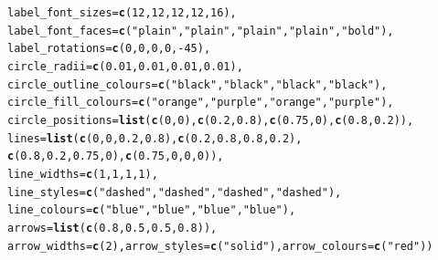 \documentclass{article}\usepackage[]{graphicx}\usepackage[]{color}
\makeatletter
\newcommand{\hlnum}[1]{\textcolor[rgb]{0.686,0.059,0.569}{#1}}%
\newcommand{\hlstr}[1]{\textcolor[rgb]{0.192,0.494,0.8}{#1}}%
\newcommand{\hlopt}[1]{\textcolor[rgb]{0,0,0}{#1}}%
\newcommand{\hlstd}[1]{\textcolor[rgb]{0.345,0.345,0.345}{#1}}%
\newcommand{\hlkwc}[1]{\textcolor[rgb]{0.333,0.667,0.333}{#1}}%
\newcommand{\hlkwd}[1]{\textcolor[rgb]{0.737,0.353,0.396}{\textbf{#1}}}%
\newenvironment{kframe}{%
 \def\at@end@of@kframe{}%
 \ifinner\ifhmode%
  \def\at@end@of@kframe{\end{minipage}}%
  \begin{minipage}{\columnwidth}%
 \fi\fi%
 \def\FrameCommand##1{\hskip\@totalleftmargin \hskip-\fboxsep
 \colorbox{shadecolor}{##1}\hskip-\fboxsep
     \hskip-\linewidth \hskip-\@totalleftmargin \hskip\columnwidth}%
 \MakeFramed {\advance\hsize-\width
   \@totalleftmargin\z@ \linewidth\hsize
   \@setminipage}}%
 {\par\unskip\endMakeFramed%
 \at@end@of@kframe}
\newenvironment{knitrout}{}{} %
\makeatother
\begin{document}
\begin{knitrout}
\begin{kframe}
\begin{alltt}
                \hlkwc{label_font_sizes}\hlstd{=}\hlkwd{c}\hlstd{(}\hlnum{12}\hlstd{,}\hlnum{12}\hlstd{,}\hlnum{12}\hlstd{,}\hlnum{12}\hlstd{,}\hlnum{16}\hlstd{),}
                \hlkwc{label_font_faces}\hlstd{=}\hlkwd{c}\hlstd{(}\hlstr{"plain"}\hlstd{,}\hlstr{"plain"}\hlstd{,}\hlstr{"plain"}\hlstd{,}\hlstr{"plain"}\hlstd{,}\hlstr{"bold"}\hlstd{),}
                \hlkwc{label_rotations}\hlstd{=}\hlkwd{c}\hlstd{(}\hlnum{0}\hlstd{,}\hlnum{0}\hlstd{,}\hlnum{0}\hlstd{,}\hlnum{0}\hlstd{,}\hlopt{-}\hlnum{45}\hlstd{),}
                \hlkwc{circle_radii}\hlstd{=}\hlkwd{c}\hlstd{(}\hlnum{0.01}\hlstd{,}\hlnum{0.01}\hlstd{,}\hlnum{0.01}\hlstd{,}\hlnum{0.01}\hlstd{),}
                \hlkwc{circle_outline_colours}\hlstd{=}\hlkwd{c}\hlstd{(}\hlstr{"black"}\hlstd{,}\hlstr{"black"}\hlstd{,}\hlstr{"black"}\hlstd{,}\hlstr{"black"}\hlstd{),}
                \hlkwc{circle_fill_colours}\hlstd{=}\hlkwd{c}\hlstd{(}\hlstr{"orange"}\hlstd{,}\hlstr{"purple"}\hlstd{,}\hlstr{"orange"}\hlstd{,}\hlstr{"purple"}\hlstd{),}
                \hlkwc{circle_positions}\hlstd{=}\hlkwd{list}\hlstd{(}\hlkwd{c}\hlstd{(}\hlnum{0}\hlstd{,}\hlnum{0}\hlstd{),}\hlkwd{c}\hlstd{(}\hlnum{0.2}\hlstd{,}\hlnum{0.8}\hlstd{),}\hlkwd{c}\hlstd{(}\hlnum{0.75}\hlstd{,}\hlnum{0}\hlstd{),}\hlkwd{c}\hlstd{(}\hlnum{0.8}\hlstd{,}\hlnum{0.2}\hlstd{)),}
                \hlkwc{lines}\hlstd{=}\hlkwd{list}\hlstd{(}\hlkwd{c}\hlstd{(}\hlnum{0}\hlstd{,}\hlnum{0}\hlstd{,}\hlnum{0.2}\hlstd{,}\hlnum{0.8}\hlstd{),}\hlkwd{c}\hlstd{(}\hlnum{0.2}\hlstd{,}\hlnum{0.8}\hlstd{,}\hlnum{0.8}\hlstd{,}\hlnum{0.2}\hlstd{),}
                        \hlkwd{c}\hlstd{(}\hlnum{0.8}\hlstd{,}\hlnum{0.2}\hlstd{,}\hlnum{0.75}\hlstd{,}\hlnum{0}\hlstd{),}\hlkwd{c}\hlstd{(}\hlnum{0.75}\hlstd{,}\hlnum{0}\hlstd{,}\hlnum{0}\hlstd{,}\hlnum{0}\hlstd{)),}
                \hlkwc{line_widths}\hlstd{=}\hlkwd{c}\hlstd{(}\hlnum{1}\hlstd{,} \hlnum{1}\hlstd{,} \hlnum{1}\hlstd{,} \hlnum{1}\hlstd{),}
                \hlkwc{line_styles}\hlstd{=}\hlkwd{c}\hlstd{(}\hlstr{"dashed"}\hlstd{,} \hlstr{"dashed"}\hlstd{,} \hlstr{"dashed"}\hlstd{,} \hlstr{"dashed"}\hlstd{),}
                \hlkwc{line_colours}\hlstd{=}\hlkwd{c}\hlstd{(}\hlstr{"blue"}\hlstd{,}\hlstr{"blue"}\hlstd{,}\hlstr{"blue"}\hlstd{,}\hlstr{"blue"}\hlstd{),}
                \hlkwc{arrows}\hlstd{=}\hlkwd{list}\hlstd{(}\hlkwd{c}\hlstd{(}\hlnum{0.8}\hlstd{,}\hlnum{0.5}\hlstd{,}\hlnum{0.5}\hlstd{,}\hlnum{0.8}\hlstd{)),}
                \hlkwc{arrow_widths}\hlstd{=}\hlkwd{c}\hlstd{(}\hlnum{2}\hlstd{),} \hlkwc{arrow_styles}\hlstd{=}\hlkwd{c}\hlstd{(}\hlstr{"solid"}\hlstd{),} \hlkwc{arrow_colours}\hlstd{=}\hlkwd{c}\hlstd{(}\hlstr{"red"}\hlstd{))}
\end{alltt}
\end{kframe}


\end{knitrout}
\end{document}
